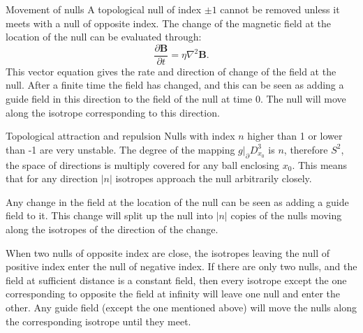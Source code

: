 \documentclass[final]{beamer}
\newlength{\onecolwid}
\newlength{\twocolwid}
\begin{document}
\begin{frame}[t]
\begin{columns}[t]
\begin{column}{\twocolwid}
\begin{columns}[t,totalwidth=\twocolwid]
\begin{column}{\onecolwid} %

\begin{block}{Movement of nulls}
    A topological null of index $\pm 1$ cannot be removed unless it meets with a null of opposite index. 
    The change of the magnetic field at the location of the null can be evaluated through:
    \begin{equation}
        \frac{\partial \mathbf{B}}{\partial t} = \eta \nabla^2 \mathbf{B}.
    \end{equation}
    This vector equation gives the rate and direction of change of the field at the null.
    After a finite time the field has changed, and this can be seen as adding a guide
    field in this direction to the field of the null at time 0. 
    The null will move along the isotrope corresponding to this direction.

\end{block}


\begin{block}{Topological attraction and repulsion}
    Nulls with index $n$ higher than 1 or lower than -1 are very unstable.  The degree of
    the mapping $g|_\partial D^3_{x_0}$ is $n$, therefore $S^2$, the space of
    directions is multiply covered for any ball enclosing $x_0$. 
    This means that for any direction $|n|$ isotropes approach the null arbitrarily
    closely. 

    Any change in the field at the location of the null can be seen as 
    adding a guide field to it. 
    This change will split up the null into $|n|$ copies of the nulls moving along the
    isotropes of the direction of the change. 

    When two nulls of opposite index are close, the isotropes leaving the null of positive
    index enter the null of negative index. 
    If there are only two nulls, and the field at sufficient distance is a constant field,
    then every isotrope except the one corresponding to opposite the field at infinity
    will leave one null and enter the other. 
    Any guide field (except the one mentioned above) will move the nulls along the
    corresponding isotrope until they meet. 
\end{block}


\end{column}
\end{columns}
\end{column}
\end{columns}
\end{frame}
\end{document}
